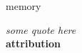 



\begin{center}
\vspace*{\fill}
\Huge memory

\vspace{2cm}

\begin{flushright}
\large
\textit{ some quote here}\\
\textbf{ attribution }
\end{flushright}
\vspace*{\fill}
\end{center}

\normalsize
